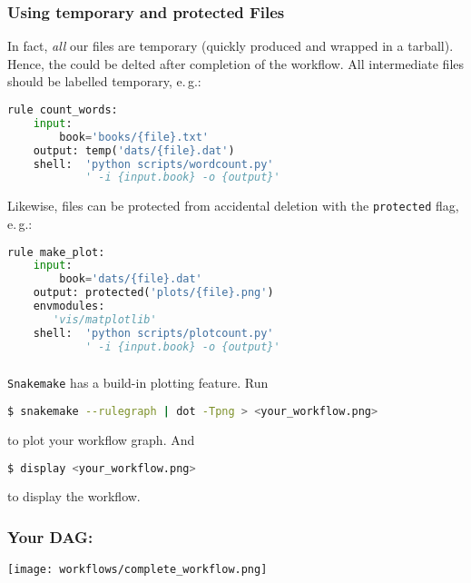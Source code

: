 \begin{frame}[fragile]
  \frametitle{Using temporary and protected Files}
  In fact, \emph{all} our files are temporary (quickly produced and wrapped in a tarball). Hence, the could be delted after completion of the workflow. All intermediate files should be labelled temporary, e.\,g.:
  \begin{lstlisting}[language=Python,style=Python,basicstyle=\tiny]
rule count_words:
    input:
        book='books/{file}.txt'
    output: temp('dats/{file}.dat')
    shell:  'python scripts/wordcount.py'
            ' -i {input.book} -o {output}'
  \end{lstlisting}
  \pause
  Likewise, files can be protected from accidental deletion with the \texttt{protected} flag, e.\,g.:
  \begin{lstlisting}[language=Python,style=Python,basicstyle=\tiny]
rule make_plot:
    input:
        book='dats/{file}.dat'
    output: protected('plots/{file}.png')
    envmodules:
       'vis/matplotlib'
    shell:  'python scripts/plotcount.py'
            ' -i {input.book} -o {output}'
  \end{lstlisting}
\end{frame}

\begin{frame}[fragile]
  \frametitle{}
  \texttt{Snakemake} has a build-in plotting feature. Run 
  \begin{lstlisting}[language=Bash, style=Shell]
$ snakemake --rulegraph | dot -Tpng > <your_workflow.png>
  \end{lstlisting}
  to plot your workflow graph. And
  \begin{lstlisting}[language=Bash, style=Shell]
$ display <your_workflow.png>
  \end{lstlisting}
  to display the workflow.
\end{frame}

\begin{frame}
  \frametitle{Your DAG:}
  \centering
  \texttt{[image: workflows/complete\_workflow.png]}
\end{frame}


